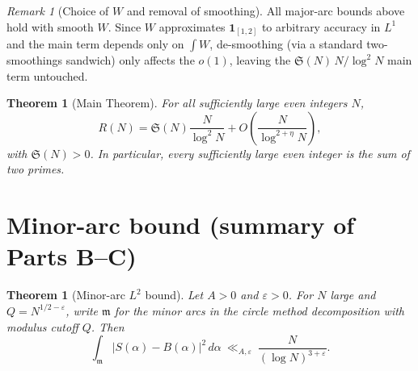 \documentclass[11pt]{article}
\newtheorem{theorem}[lemma]{Theorem}
\theoremstyle{definition}
\theoremstyle{remark}
\newtheorem{remark}[lemma]{Remark}
\numberwithin{equation}{part}
\begin{document}
\begin{remark}[Choice of $W$ and removal of smoothing]
	All major-arc bounds above hold with smooth $W$.
	Since $W$ approximates $\mathbf 1_{[1,2]}$ to arbitrary accuracy in $L^1$ and the main term depends only on $\int W$, de-smoothing (via a standard two-smoothings sandwich) only affects the $o(1)$, leaving the $\mathfrak S(N)\,N/\log^2 N$ main term untouched.
\end{remark}

\begin{theorem}[Main Theorem]
	For all sufficiently large even integers $N$,
	\[
		R(N)=\mathfrak S(N)\frac{N}{\log^2 N}
		+ O\!\left(\frac{N}{\log^{2+\eta}N}\right),
	\]
	with $\mathfrak S(N)>0$.
	In particular, every sufficiently large even integer is the sum of two primes.
\end{theorem}


\section{Minor-arc bound (summary of Parts B--C)}\label{sec:minor-bound}

\begin{theorem}[Minor-arc $L^2$ bound]\label{thm:minor-L2}
	Let $A>0$ and $\varepsilon>0$. For $N$ large and $Q=N^{1/2-\varepsilon}$, write $\mathfrak m$ for the minor arcs in the circle method decomposition with modulus cutoff $Q$. Then
	\begin{equation}\label{eq:minor-L2}
		\int_{\mathfrak m} \big|S(\alpha)-B(\alpha)\big|^2\,d\alpha \ \ll_{A,\varepsilon}\ \frac{N}{(\log N)^{3+\varepsilon}}.
	\end{equation}
\end{theorem}
\end{document}
